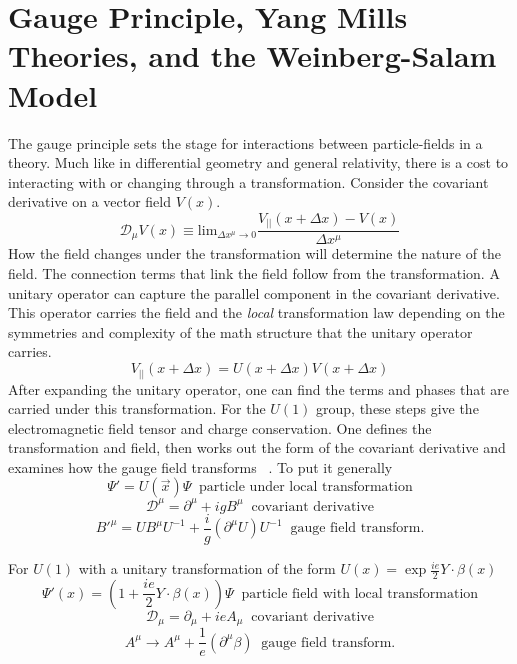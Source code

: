 \section{Gauge Principle, Yang Mills Theories, and the Weinberg-Salam Model}
The gauge principle sets the stage for interactions between particle-fields in a theory. Much like in differential geometry and general relativity, there is a cost to interacting with or changing through a transformation. Consider the covariant derivative on a vector field $V(x)$.
\begin{equation}\mathcal{D}_\mu V(x) \equiv \text{lim}_{\Delta x^{\mu} \rightarrow 0 } \frac{V_{||}(x+\Delta x) - V(x)}{\Delta x^{\mu}} \end{equation} 
How the field changes under the transformation will determine the nature of the field. The connection terms that link the field follow from the transformation. A unitary operator can capture the parallel component in the covariant derivative. This operator carries the field and the \textit{local} transformation law depending on the symmetries and complexity of the math structure that the unitary operator carries. 
\begin{equation}V_{||}(x+\Delta x) = U(x+\Delta x)V(x+\Delta x)\end{equation}
After expanding the unitary operator, one can find the terms and phases that are carried under this transformation. 
For the $U(1)$ group, these steps give the electromagnetic field tensor and charge conservation. 
One defines the transformation and field, then works out the form of the covariant derivative and examines how the gauge field transforms ~\cite{Tully:1417476}. To put it generally
\begin{equation}
\label{eq:lt}
\Psi'= U(\overrightarrow{x})\Psi \;\;\text{particle under local transformation}\end{equation}
\begin{equation}
\label{eq:cd}
\mathcal{D}^\mu = \partial^\mu + igB^\mu \;\;\text{covariant derivative}
\end{equation}
\begin{equation}
\label{eq:gt}
B'^\mu = UB^\mu U^{-1} + \frac{i}{g}(\partial^\mu U)U^{-1} \;\;\text{gauge field transform.} 
\end{equation} 

For $U(1)$ with a unitary transformation of the form $U(x) = \exp{\frac{ie}{2}Y\cdot\beta(x)}$ 
\begin{equation}\Psi'(x)= (1+\frac{ie}{2}Y\cdot\beta(x))\Psi \;\;\text{particle field with local transformation}\end{equation}
\begin{equation}\mathcal{D}_\mu = \partial_\mu + ieA_\mu \;\;\text{covariant derivative}\end{equation}
\begin{equation}A^\mu \rightarrow A^\mu + \frac{1}{e}(\partial^\mu \beta) \;\;\text{gauge field transform.} \end{equation} 


